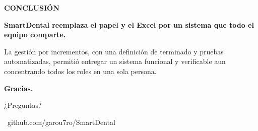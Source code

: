 \documentclass[aspectratio=169,11pt]{beamer}
\begin{document}
{
\begin{frame}[plain]
\vspace*{0.4cm}
\hspace*{0.2cm}\begin{minipage}{0.86\textwidth}
{\scriptsize\bfseries\color{sdmint}CONCLUSIÓN\par}
\vspace{0.3cm}
{\fontsize{26}{31}\selectfont\bfseries\color{white}SmartDental reemplaza el papel y el Excel por un sistema que todo el equipo comparte.\par}
\vspace{0.5cm}
{\normalsize\color{white!78}La gestión por incrementos, con una definición de terminado y pruebas automatizadas, permitió entregar un sistema funcional y verificable aun concentrando todos los roles en una sola persona.\par}
\vspace{1.1cm}
{\fontsize{30}{32}\selectfont\bfseries\color{white}Gracias.\ }{\large\color{sdmint}¿Preguntas?\par}
\vspace{0.25cm}
{\footnotesize\color{white!55}\faLink\ github.com/garou7ro/SmartDental\par}
\end{minipage}
\end{frame}}
\end{document}

